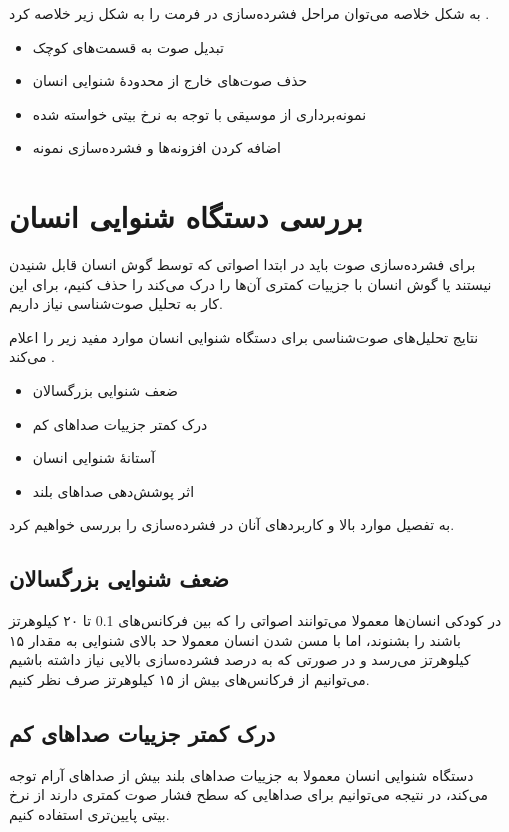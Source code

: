  به شکل خلاصه می‌توان مراحل فشرده‌سازی در فرمت  
 را به شکل زیر خلاصه کرد \cite{how_mp3_works}.

 \begin{itemize}
         \item تبدیل صوت به قسمت‌های کوچک
         \item حذف صوت‌های خارج از محدودهٔ شنوایی انسان
         \item نمونه‌برداری از موسیقی با توجه به نرخ بیتی خواسته شده
         \item اضافه کردن افزونه‌ها و فشرده‌سازی نمونه
 \end{itemize}

\section{بررسی دستگاه شنوایی انسان}
برای فشرده‌سازی صوت باید در ابتدا اصواتی که توسط گوش انسان قابل شنیدن نیستند یا گوش انسان با جزییات کمتری آن‌ها را درک می‌کند را حذف کنیم، برای 
این کار به تحلیل صوت‌شناسی
نیاز داریم. 

نتایج تحلیل‌های صوت‌شناسی برای دستگاه شنوایی انسان موارد مفید زیر را اعلام می‌کند \cite{psychoacoustic}.

\begin{itemize}
        \item ضعف شنوایی بزرگسالان
        \item درک کمتر جزییات صداهای کم
        \item آستانهٔ شنوایی انسان
        \item اثر پوشش‌دهی صداهای بلند
\end{itemize}

به تفصیل موارد بالا و کاربرد‌های آنان در فشرده‌سازی را بررسی خواهیم کرد.

\subsection{ضعف شنوایی بزرگسالان}
در کودکی انسان‌ها معمولا می‌توانند اصواتی را که بین فرکانس‌های 0.1 تا ۲۰ کیلوهرتز باشند را بشنوند، اما با مسن شدن انسان معمولا حد بالای شنوایی 
به مقدار ۱۵ کیلوهرتز می‌رسد و در صورتی که به درصد فشرده‌سازی بالایی نیاز داشته باشیم می‌توانیم از فرکانس‌های بیش از ۱۵ کیلوهرتز صرف نظر کنیم.

\subsection{درک کمتر جزییات صداهای کم}
دستگاه شنوایی انسان معمولا به جزییات صداهای بلند بیش از صداهای آرام توجه می‌کند، در نتیجه می‌توانیم برای صداهایی که 
سطح فشار صوت 
 کمتری دارند از نرخ بیتی پایین‌تری استفاده کنیم. 


